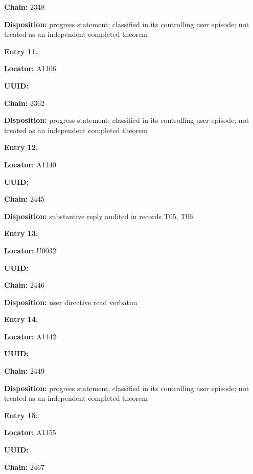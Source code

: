 \textbf{Chain:} 2348

\textbf{Disposition:} progress statement; classified in its controlling
user episode; not treated as an independent completed theorem


\textbf{Entry 11.}

\textbf{Locator:} A1106

\textbf{UUID:} \protect{}

\textbf{Chain:} 2362

\textbf{Disposition:} progress statement; classified in its controlling
user episode; not treated as an independent completed theorem


\textbf{Entry 12.}

\textbf{Locator:} A1140

\textbf{UUID:} \protect{}

\textbf{Chain:} 2445

\textbf{Disposition:} substantive reply audited in records T05, T06


\textbf{Entry 13.}

\textbf{Locator:} U0032

\textbf{UUID:} \protect{}

\textbf{Chain:} 2446

\textbf{Disposition:} user directive read verbatim


\textbf{Entry 14.}

\textbf{Locator:} A1142

\textbf{UUID:} \protect{}

\textbf{Chain:} 2449

\textbf{Disposition:} progress statement; classified in its controlling
user episode; not treated as an independent completed theorem


\textbf{Entry 15.}

\textbf{Locator:} A1155

\textbf{UUID:} \protect{}

\textbf{Chain:} 2467

